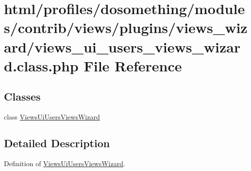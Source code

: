\hypertarget{views__ui__users__views__wizard_8class_8php}{
\section{html/profiles/dosomething/modules/contrib/views/plugins/views\_\-wizard/views\_\-ui\_\-users\_\-views\_\-wizard.class.php File Reference}
\label{views__ui__users__views__wizard_8class_8php}
}
\subsection*{Classes}
\begin{DoxyCompactItemize}
\item 
class \hyperlink{classViewsUiUsersViewsWizard}{ViewsUiUsersViewsWizard}
\end{DoxyCompactItemize}


\subsection{Detailed Description}
Definition of \hyperlink{classViewsUiUsersViewsWizard}{ViewsUiUsersViewsWizard}. 